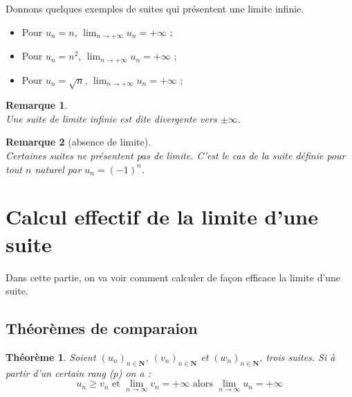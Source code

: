 \documentclass[12pt,a4paper]{article}
\newcommand{\N}{\mathbf{N}}
\theoremstyle{break}
\newtheorem{theoreme}{Théorème}
\theoremstyle{plain}
\theoremstyle{nonumberplain}
\newtheorem{remarque}{Remarque}
\theoremstyle{nonumberbreak}
\begin{document}

Donnons quelques exemples de suites qui présentent une limite infinie.

\begin{itemize}
  \item Pour $u_n = n$, $\lim_{n\to +\infty}u_n = +\infty$ ;
  \item Pour $u_n = {n^2}$, $\lim_{n\to +\infty}u_n = +\infty$ ;
  \item Pour $u_n = \sqrt{n}$, $\lim_{n\to +\infty}u_n = +\infty$ ;
\end{itemize}

\begin{remarque}~\\
  Une suite de limite infinie est dite divergente vers $\pm\infty$.
\end{remarque}

\begin{remarque}[absence de limite]~\\
  Certaines suites ne présentent pas de limite. C'est le cas de la suite
  définie pour tout $n$ naturel par $u_n = (-1)^n$.
\end{remarque}

\section{Calcul effectif de la limite d'une suite}

Dans cette partie, on va voir comment calculer de façon efficace la
limite d'une suite.

\subsection{Théorèmes de comparaion}

\begin{theoreme}
  Soient $(u_n)_{n\in\N}$, $(v_n)_{n\in\N}$ et $(w_n)_{n\in\N}$, trois
  suites. Si à partir d'un certain rang ($p$) on a : \[ u_n \geq v_n
    \text{ et } \lim_{n\to\infty} v_n = +\infty \text{ alors }
  \lim_{n\to\infty} u_n = +\infty \]
\end{theoreme}
\end{document}
